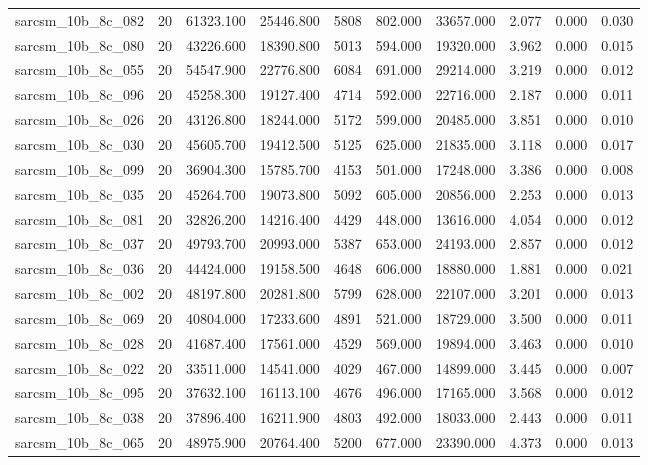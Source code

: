 \begin{tabular}{lrrrrrrrrr}
sarcsm\_10b\_8c\_082 & 20 & 61323.100 & 25446.800 & 5808 & 802.000 & 33657.000 & 2.077 & 0.000 & 0.030 \\
sarcsm\_10b\_8c\_080 & 20 & 43226.600 & 18390.800 & 5013 & 594.000 & 19320.000 & 3.962 & 0.000 & 0.015 \\
sarcsm\_10b\_8c\_055 & 20 & 54547.900 & 22776.800 & 6084 & 691.000 & 29214.000 & 3.219 & 0.000 & 0.012 \\
sarcsm\_10b\_8c\_096 & 20 & 45258.300 & 19127.400 & 4714 & 592.000 & 22716.000 & 2.187 & 0.000 & 0.011 \\
sarcsm\_10b\_8c\_026 & 20 & 43126.800 & 18244.000 & 5172 & 599.000 & 20485.000 & 3.851 & 0.000 & 0.010 \\
sarcsm\_10b\_8c\_030 & 20 & 45605.700 & 19412.500 & 5125 & 625.000 & 21835.000 & 3.118 & 0.000 & 0.017 \\
sarcsm\_10b\_8c\_099 & 20 & 36904.300 & 15785.700 & 4153 & 501.000 & 17248.000 & 3.386 & 0.000 & 0.008 \\
sarcsm\_10b\_8c\_035 & 20 & 45264.700 & 19073.800 & 5092 & 605.000 & 20856.000 & 2.253 & 0.000 & 0.013 \\
sarcsm\_10b\_8c\_081 & 20 & 32826.200 & 14216.400 & 4429 & 448.000 & 13616.000 & 4.054 & 0.000 & 0.012 \\
sarcsm\_10b\_8c\_037 & 20 & 49793.700 & 20993.000 & 5387 & 653.000 & 24193.000 & 2.857 & 0.000 & 0.012 \\
sarcsm\_10b\_8c\_036 & 20 & 44424.000 & 19158.500 & 4648 & 606.000 & 18880.000 & 1.881 & 0.000 & 0.021 \\
sarcsm\_10b\_8c\_002 & 20 & 48197.800 & 20281.800 & 5799 & 628.000 & 22107.000 & 3.201 & 0.000 & 0.013 \\
sarcsm\_10b\_8c\_069 & 20 & 40804.000 & 17233.600 & 4891 & 521.000 & 18729.000 & 3.500 & 0.000 & 0.011 \\
sarcsm\_10b\_8c\_028 & 20 & 41687.400 & 17561.000 & 4529 & 569.000 & 19894.000 & 3.463 & 0.000 & 0.010 \\
sarcsm\_10b\_8c\_022 & 20 & 33511.000 & 14541.000 & 4029 & 467.000 & 14899.000 & 3.445 & 0.000 & 0.007 \\
sarcsm\_10b\_8c\_095 & 20 & 37632.100 & 16113.100 & 4676 & 496.000 & 17165.000 & 3.568 & 0.000 & 0.012 \\
sarcsm\_10b\_8c\_038 & 20 & 37896.400 & 16211.900 & 4803 & 492.000 & 18033.000 & 2.443 & 0.000 & 0.011 \\
sarcsm\_10b\_8c\_065 & 20 & 48975.900 & 20764.400 & 5200 & 677.000 & 23390.000 & 4.373 & 0.000 & 0.013 \\

\end{tabular}
